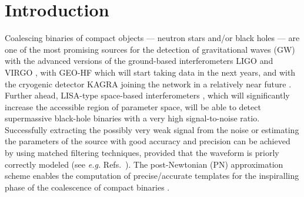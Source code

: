 \documentclass[
superscriptaddress,
preprint,
prd,tightenlines,showpacs,nofootinbib,
eqsecnum,
amsfonts,amsmath,amssymb]{revtex4-1}
\begin{document}
\pacs{}

\maketitle


\section{Introduction}
\label{Introduction}

Coalescing binaries of compact objects --- neutron stars and/or black
holes --- are one of the most promising sources for the detection of
gravitational waves (GW) with the advanced versions of the
ground-based interferometers LIGO \cite{Abbott2009,LIGOwebsite} and
VIRGO \cite{Accadia2012a,VIRGOwebsite}, with GEO-HF \cite{Grote2008}
which will start taking data in the next years, and with the cryogenic
detector KAGRA joining the network in a relatively near future
\cite{Kuroda2010}. Further ahead, LISA-type space-based
interferometers \cite{Amaro-Seoane2012,eLISAwebsite}, which will
significantly increase the accessible region of parameter space, will
be able to detect supermassive black-hole binaries with a very high
signal-to-noise ratio. Successfully extracting the possibly very weak signal
from the noise or estimating the parameters of the source with good
accuracy and precision can be achieved by using matched filtering
techniques, provided that the waveform is priorly correctly modeled
(see \textit{e.g.} Refs.~\cite{Cutler1993, Cutler1994}). The
post-Newtonian (PN) approximation scheme enables the computation of
precise/accurate templates for the inspiralling phase of the
coalescence of compact binaries \cite{Blanchet2006a}.
\end{document}
